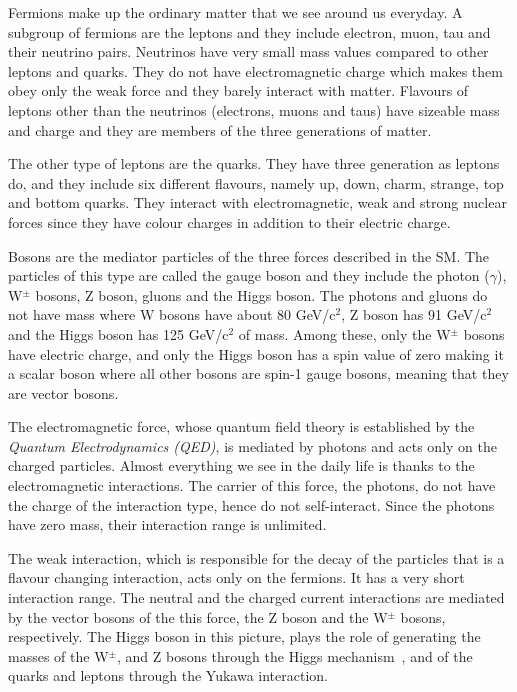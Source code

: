 Fermions make up the ordinary matter that we see around us everyday. A subgroup of fermions are the leptons and they include electron, muon, tau and their neutrino pairs. Neutrinos have very small mass values compared to other leptons and quarks. They do not have electromagnetic charge which makes them obey only the weak force and they barely interact with matter. Flavours of leptons other than the neutrinos (electrons, muons and taus) have sizeable mass and charge and they are members of the three generations of matter.

The other type of leptons are the quarks. They have three generation as leptons do, and they include six different flavours, namely up, down, charm, strange, top and bottom quarks. They interact with electromagnetic, weak and strong nuclear forces since they have colour charges in addition to their electric charge. 

Bosons are the mediator particles of the three forces described in the SM. The particles of this type are called the gauge boson and they include the photon ($\gamma$), W$^{\pm}$ bosons, Z boson, gluons and the Higgs boson. The photons and gluons do not have mass where W bosons have about 80 GeV/c$^{2}$, Z boson has 91 GeV/c$^{2}$ and the Higgs boson has 125 GeV/c$^{2}$ of mass. Among these, only the W$^{\pm}$ bosons have electric charge, and only the Higgs boson has a spin value of zero making it a scalar boson where all other bosons are spin-1 gauge bosons, meaning that they are vector bosons.

The electromagnetic force, whose quantum field theory is established by the \emph{Quantum Electrodynamics (QED)}, is mediated by photons and acts only on the charged particles.  Almost everything we see in the daily life is thanks to the electromagnetic interactions. The carrier of this force, the photons, do not have the charge of the interaction type, hence do not self-interact. Since the photons have zero mass, their interaction range is unlimited.

The weak interaction, which is responsible for the decay of the particles that is a flavour changing interaction, acts only on the fermions. It has a very short interaction range. The neutral and the charged current interactions are mediated by the vector bosons of the this force, the Z boson and the W$^{\pm}$ bosons, respectively. The Higgs boson in this picture, plays the role of generating the masses of the W$^{\pm}$, and Z bosons through the Higgs mechanism~\cite{Higgs1964, BroutEnglert, Guralnik1964}, and of the quarks and leptons through the Yukawa interaction\cite{Weinberg1967}.

